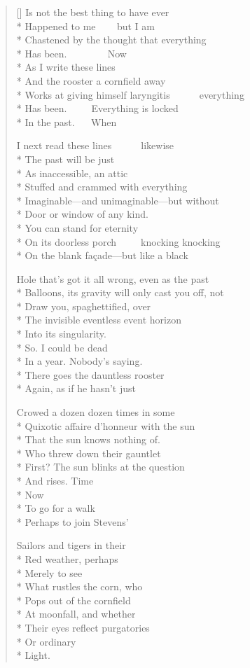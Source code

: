 \label{ch:lung_cancer}
\settowidth{\versewidth}{Works at giving himself laryngitis       everything}
\begin{verse}[\versewidth]
Is not the best thing to have ever\\*
Happened to me     but I am\\*
Chastened by the thought that everything\\*
Has been.          Now\\*
As I write these lines\\*
And the rooster a cornfield away\\*
Works at giving himself laryngitis       everything\\*
Has been.      Everything is locked\\*
In the past.    When

I next read these lines       likewise\\*
The past will be just\\*
As inaccessible, an attic\\*
Stuffed and crammed with everything\\*
Imaginable---and unimaginable---but without\\*
Door or window of any kind.\\*
You can stand for eternity\\*
On its doorless porch      knocking knocking\\*
On the blank façade---but like a black

Hole that's got it all wrong, even as the past\\*
Balloons, its gravity will only cast you off, not\\*
Draw you, spaghettified, over\\*
The invisible eventless event horizon\\*
Into its singularity.\\*
So.      I could be dead\\*
In a year. Nobody's saying.\\*
There goes the dauntless rooster\\*
Again, as if he hasn't just

Crowed a dozen dozen times in some\\*
Quixotic affaire d'honneur with the sun\\*
That the sun knows nothing of.\\*
Who threw down their gauntlet\\*
First? The sun blinks at the question\\*
And rises. Time\\*
Now\\*
To go for a walk\\*
Perhaps to join Stevens'


Sailors and tigers in their\\*
Red weather, perhaps\\*
Merely to see\\*
What rustles the corn, who\\*
Pops out of the cornfield\\*
At moonfall, and whether\\*
Their eyes reflect purgatories\\*
Or ordinary\\*
Light.
\end{verse}
